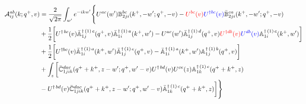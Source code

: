 \documentclass[aps,prd,amsmath,amssymb,nofootinbib]{revtex4-2}
\def\mf#1{\mathbb{#1}}
\numberwithin{equation}{section}
\begin{document}
\begin{align}
     {\cal A}^{ab}_{ij}(k; q^+, v) & = \frac{2}{\sqrt{2\pi}} \int_{w^{\prime}}e^{-i k w^\prime}\Bigg\{U^{ac}(w^{\prime}) \mf{B}^{bc}_{2ji}(k^{+},-w^{\prime};q^{+},-v)-\textcolor{red}{U^{bc}(v)}\textcolor{blue}{U^{\dagger bc}(v)}\Bar{\mf{B}}^{ca}_{2ji}(k^{+},-w^{\prime}; q^{+},-v)\notag \\ & +\frac{1}{2}\bigg[U^{\dagger\, bc}(v)\Bar{\mf{A}}^{\dagger\,(1)\, c}_{1j}(q^{+},v)\Bar{\mf{A}}^{\dagger\,(1)\, a}_{1i}(k^{+},w^{\prime})-U^{ac}(w^{\prime}) \Bar{\mf{A}}^{\dagger\,(1)\, d}_{1j}(q^{+},v)\textcolor{red}{U^{\dagger db}(v)}\textcolor{blue}{U^{db}(v)} \mf{A}^{\dagger\,(1)\, c}_{1i}(k^{+},w^{\prime})\bigg]\notag \\ & +\frac{1}{2}\bigg[U^{\dagger bc}(v)\Bar{\mf{A}}^{\dagger\, (1)\, a}_{1i}(k^{+},w^{\prime})\Bar{\mf{A}}^{\dagger \, (1)\, c}_{1j}(q^{+},v)-\Bar{\mf{A}}^{\dagger\,(1)\, a}_{1i}(k^{+},w^{\prime}) \mf{A}^{\dagger\,(1)\, b}_{1j}(q^{+},v)\bigg]\notag \\ & +\int_{z}\bigg[\Bar{\mf{C}}^{dac}_{1jik}(q^{+}+k^{+},z-w^{\prime}; q^{+},w^{\prime}-v)U^{\dagger\, bd}(v)U^{ce}(z) \mf{A}^{\dagger\,(1)\,e}_{1k}(q^{+}+k^{+},z)\notag \\ &-U^{\dagger\, bd}(v) \Bar{\mf{C}}^{dac}_{1jik}(q^{+}+k^{+},z-w^{\prime}; q^{+},w^{\prime}-v)\Bar{\mf{A}}^{\dagger\,(1)\,c}_{1k}(q^{+}+k^{+},z)\bigg]\Bigg\}
\end{align}
\end{document}
